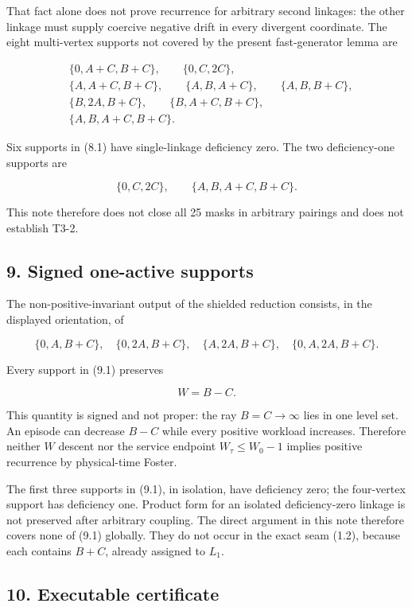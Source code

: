 That fact alone does not prove recurrence for arbitrary second linkages:
the other linkage must supply coercive negative drift in every divergent
coordinate. The eight multi-vertex supports not covered by the present
fast-generator lemma are

\[
\begin{split}
 &\{0,A+C,B+C\},\qquad \{0,C,2C\},\\
 &\{A,A+C,B+C\},\qquad \{A,B,A+C\},\qquad \{A,B,B+C\},\\
 &\{B,2A,B+C\},\qquad \{B,A+C,B+C\},\\
 &\{A,B,A+C,B+C\}.
\end{split}
\tag{8.1}
\]

Six supports in (8.1) have single-linkage deficiency zero. The two
deficiency-one supports are

\[
 \{0,C,2C\},\qquad\{A,B,A+C,B+C\}.
\tag{8.2}
\]

This note therefore does not close all 25 masks in arbitrary pairings
and does not establish T3-2.

\subsection{9. Signed one-active
supports}

The non-positive-invariant output of the shielded reduction consists, in
the displayed orientation, of

\[
 \{0,A,B+C\},\quad
 \{0,2A,B+C\},\quad
 \{A,2A,B+C\},\quad
 \{0,A,2A,B+C\}.
\tag{9.1}
\]

Every support in (9.1) preserves

\[
 W=B-C.
\tag{9.2}
\]

This quantity is signed and not proper: the ray \(B=C\to\infty\) lies in
one level set. An episode can decrease \(B-C\) while every positive
workload increases. Therefore neither \(W\) descent nor the service
endpoint \(W_\tau\le W_0-1\) implies positive recurrence by
physical-time Foster.

The first three supports in (9.1), in isolation, have deficiency zero;
the four-vertex support has deficiency one. Product form for an isolated
deficiency-zero linkage is not preserved after arbitrary coupling. The
direct argument in this note therefore covers none of (9.1) globally.
They do not occur in the exact seam (1.2), because each contains
\(B+C\), already assigned to \(L_1\).

\subsection{10. Executable certificate}

